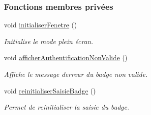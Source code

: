 \subsubsection*{Fonctions membres privées}
\begin{DoxyCompactItemize}
\item 
void \hyperlink{class_ihm_authentification_a4698f8d828773e365104d78e3ac3b9ce}{initialiser\+Fenetre} ()
\begin{DoxyCompactList}\small\item\em Initialise le mode plein écran. \end{DoxyCompactList}\item 
void \hyperlink{class_ihm_authentification_a91a8934658e317870fb6b931608824db}{afficher\+Authentification\+Non\+Valide} ()
\begin{DoxyCompactList}\small\item\em Affiche le message d\textquotesingle{}erreur du badge non valide. \end{DoxyCompactList}\item 
void \hyperlink{class_ihm_authentification_afa429a3de1da16117b7ce4c9d8f40160}{reinitialiser\+Saisie\+Badge} ()
\begin{DoxyCompactList}\small\item\em Permet de reinitialiser la saisie du badge. \end{DoxyCompactList}\end{DoxyCompactItemize}
